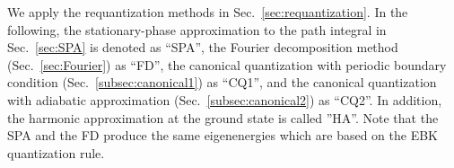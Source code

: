 \documentclass[%
superscriptaddress,
preprint,
showpacs,
nofootinbib,
amsmath,amssymb,
prc,
floatfix ]%
{revtex4-1}
\begin{document}



We apply the requantization methods in Sec.~\ref{sec:requantization}.
In the following, the stationary-phase approximation to the path
integral in Sec.~\ref{sec:SPA} is denoted as ``SPA'',
the Fourier decomposition method (Sec.~\ref{sec:Fourier}) as ``FD'',
 the canonical quantization with periodic boundary condition 
(Sec.~\ref{subsec:canonical1}) as ``CQ1'', and the canonical quantization 
with adiabatic approximation (Sec.~\ref{subsec:canonical2})  as ``CQ2''.
In addition, the harmonic approximation at the ground state is
called ''HA''.
Note that the SPA and the FD produce the same eigenenergies which
are based on the EBK quantization rule.
\end{document}
